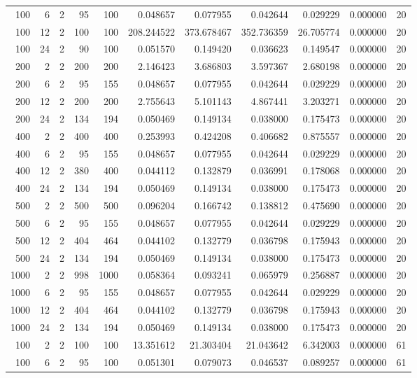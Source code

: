 \begin{table}
\begin{tabular}{rrrrrrrrrrr}
100 & 6 & 2 & 95 & 100 & 0.048657 & 0.077955 & 0.042644 & 0.029229 & 0.000000 & 20 \\
100 & 12 & 2 & 100 & 100 & 208.244522 & 373.678467 & 352.736359 & 26.705774 & 0.000000 & 20 \\
100 & 24 & 2 & 90 & 100 & 0.051570 & 0.149420 & 0.036623 & 0.149547 & 0.000000 & 20 \\
200 & 2 & 2 & 200 & 200 & 2.146423 & 3.686803 & 3.597367 & 2.680198 & 0.000000 & 20 \\
200 & 6 & 2 & 95 & 155 & 0.048657 & 0.077955 & 0.042644 & 0.029229 & 0.000000 & 20 \\
200 & 12 & 2 & 200 & 200 & 2.755643 & 5.101143 & 4.867441 & 3.203271 & 0.000000 & 20 \\
200 & 24 & 2 & 134 & 194 & 0.050469 & 0.149134 & 0.038000 & 0.175473 & 0.000000 & 20 \\
400 & 2 & 2 & 400 & 400 & 0.253993 & 0.424208 & 0.406682 & 0.875557 & 0.000000 & 20 \\
400 & 6 & 2 & 95 & 155 & 0.048657 & 0.077955 & 0.042644 & 0.029229 & 0.000000 & 20 \\
400 & 12 & 2 & 380 & 400 & 0.044112 & 0.132879 & 0.036991 & 0.178068 & 0.000000 & 20 \\
400 & 24 & 2 & 134 & 194 & 0.050469 & 0.149134 & 0.038000 & 0.175473 & 0.000000 & 20 \\
500 & 2 & 2 & 500 & 500 & 0.096204 & 0.166742 & 0.138812 & 0.475690 & 0.000000 & 20 \\
500 & 6 & 2 & 95 & 155 & 0.048657 & 0.077955 & 0.042644 & 0.029229 & 0.000000 & 20 \\
500 & 12 & 2 & 404 & 464 & 0.044102 & 0.132779 & 0.036798 & 0.175943 & 0.000000 & 20 \\
500 & 24 & 2 & 134 & 194 & 0.050469 & 0.149134 & 0.038000 & 0.175473 & 0.000000 & 20 \\
1000 & 2 & 2 & 998 & 1000 & 0.058364 & 0.093241 & 0.065979 & 0.256887 & 0.000000 & 20 \\
1000 & 6 & 2 & 95 & 155 & 0.048657 & 0.077955 & 0.042644 & 0.029229 & 0.000000 & 20 \\
1000 & 12 & 2 & 404 & 464 & 0.044102 & 0.132779 & 0.036798 & 0.175943 & 0.000000 & 20 \\
1000 & 24 & 2 & 134 & 194 & 0.050469 & 0.149134 & 0.038000 & 0.175473 & 0.000000 & 20 \\
100 & 2 & 2 & 100 & 100 & 13.351612 & 21.303404 & 21.043642 & 6.342003 & 0.000000 & 61 \\
100 & 6 & 2 & 95 & 100 & 0.051301 & 0.079073 & 0.046537 & 0.089257 & 0.000000 & 61 \\

\end{tabular}
\end{table}
